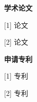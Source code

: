


\begin{flushleft}
\textbf{\Large 学术论文}

[1] 论文

[2] 论文

\end{flushleft}
\hspace{2cm}

\begin{flushleft}
\textbf{\Large 申请专利}

[1] 专利

[2] 专利

\end{flushleft}

